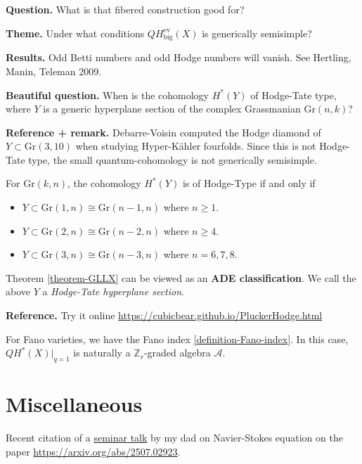 {\bf Question.} What is that fibered construction good for?


{\bf Theme.} Under what conditions $QH^{\text{ev}}_{\text{big}}(X)$ is
generically semisimple?

{\bf Results.} Odd Betti numbers and odd Hodge numbers will vanish. See
Hertling, Manin, Teleman 2009.

{\bf Beautiful question.} When is the cohomology $H^*(Y)$ of Hodge-Tate type,
where $Y$ is a generic hyperplane section of the complex Grassmanian
$\text{Gr}(n,k)$?

{\bf Reference + remark.} Debarre-Voisin computed the Hodge diamond of $Y
\subset \text{Gr}(3,10)$ when studying Hyper-Kähler fourfolds. Since this is not
Hodge-Tate type, the small quantum-cohomology is not generically semisimple.

\begin{theorem}
\label{theorem-GLLX}
For $\text{Gr}(k,n)$, the cohomology $H^{*}(Y)$ is of Hodge-Type if and only if
\begin{itemize}
\item $Y \subset \text{Gr}(1,n)\cong \text{Gr}(n-1,n)$ where $n\geq 1$.
\item $Y \subset \text{Gr}(2,n) \cong \text{Gr}(n-2,n)$ where $n \geq 4$.
\item $Y \subset\text{Gr}(3,n) \cong\text{Gr}(n-3,n)$ where $n=6,7,8$.
\end{itemize}
\end{theorem}

Theorem \ref{theorem-GLLX} can be viewed as an {\bf ADE classification}. We call
the above $Y$ a {\it Hodge-Tate hyperplane section}.

{\bf Reference.} Try it online
\url{https://cubicbear.github.io/PluckerHodge.html} 

For Fano varieties, we have the Fano index \ref{definition-Fano-index}. In this
case, $QH^*(X)|_{q=1}$ is naturally a $\mathbb{Z}_r$-graded algebra
$\mathcal{A}$.

\section{Miscellaneous}
\label{section-miscellaneous}

Recent citation of a \href{https://www.youtube.com/watch?v=luthVy-H9OI}{seminar
talk} by my dad on Navier-Stokes equation on the paper
\href{https://arxiv.org/abs/2507.02923}{https://arxiv.org/abs/2507.02923}.
 




